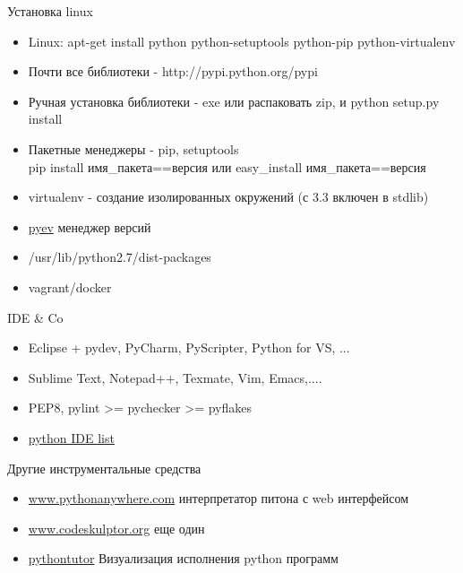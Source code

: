 \documentclass{article}
\begin{document}
\begin{center} Установка linux \end{center}
\begin{itemize}
    \item Linux: apt-get install python python-setuptools python-pip python-virtualenv
    \item Почти все библиотеки - http://pypi.python.org/pypi
    \item Ручная установка библиотеки - exe или распаковать zip, и python setup.py install
    \item Пакетные менеджеры - pip, setuptools \\
    	    pip install имя\_пакета==версия или easy\_install имя\_пакета==версия
    \item virtualenv - создание изолированных окружений (с 3.3 включен в stdlib)
    \item \href{https://github.com/yyuu/pyenv}{pyev} менеджер версий
    \item /usr/lib/python2.7/dist-packages
    \item vagrant/docker
\end{itemize}
\newpage

\begin{center} IDE \& Co \end{center}
\begin{itemize}
    \item Eclipse + pydev, PyCharm, PyScripter, Python for VS, ...
    \item Sublime Text, Notepad++, Texmate, Vim, Emacs,....
    \item PEP8, pylint >= pychecker >= pyflakes
    \item \href{http://wiki.python.org/moin/IntegratedDevelopmentEnvironments}{python IDE list}
\end{itemize}
\newpage

\begin{center} Другие инструментальные средства \end{center}
\begin{itemize}
    \item \href{https://www.pythonanywhere.com/}{www.pythonanywhere.com} интерпретатор питона с web интерфейсом
    \item \href{http://www.codeskulptor.org/}{www.codeskulptor.org} еще один
    \item \href{http://www.pythontutor.com/visualize.html}{pythontutor} Визуализация исполнения python программ 
\end{itemize}
\newpage
\end{document}
